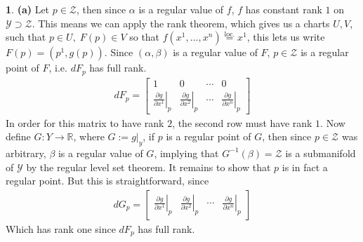 \documentclass[10.5pt]{article}
\theoremstyle{definition}
\newtheorem{pb}{}
\begin{document}
    \begin{pb}
        \textbf{(a)}
        Let \(p \in \mathcal{Z}\), then since \(\alpha\) is a regular value of \(f\), \(f\) has constant rank \(1\) on \(\mathcal{Y} \supset \mathcal{Z}\).
        This means we can apply the rank theorem, which gives us a charts \(U,V\), such that \(p \in U, \; F(p) \in V\) so that \(f(x^1,\hdots,x^n) \overset{\text{loc.}}{=} x^1\),
        this lets us write \(F(p) = (p^1,g(p))\).
        Since \((\alpha,\beta)\) is a regular value of \(F\), \(p \in \mathcal{Z}\) is a regular point of \(F\), i.e. \(dF_p\) has full rank.
        \begin{align*}
            dF_p = 
            \begin{bmatrix} 1 & 0 & \cdots & 0 \\
                            \left.\frac{\partial g}{\partial x^1}\right\vert_p & \left.\frac{\partial g}{\partial x^2}\right\vert_p
                            & \cdots & \left.\frac{\partial g}{\partial x^n}\right\vert_p
            \end{bmatrix}
        \end{align*}
        In order for this matrix to have rank \(2\), the second row must have rank \(1\). Now define \(G: Y \to \mathbb{R}\), where \(G := g\vert_y\), if \(p\) is a regular
        point of \(G\), then since \(p \in \mathcal{Z}\) was arbitrary, \(\beta\) is a regular value of \(G\), implying that \(G^{-1}(\beta) = \mathcal{Z}\) is a submanifold of
        \(\mathcal{Y}\) by the regular level set theorem. It remains to show that \(p \) is in fact a regular point. But this is straightforward, since
        \begin{align*}
            dG_p = \begin{bmatrix} \left.\frac{\partial g}{\partial x^1}\right\vert_p & \left.\frac{\partial g}{\partial x^2}\right\vert_p
                & \cdots & \left.\frac{\partial g}{\partial x^n}\right\vert_p \end{bmatrix}
        \end{align*}
        Which has rank one since \(dF_p\) has full rank.


\end{pb}
\end{document}

